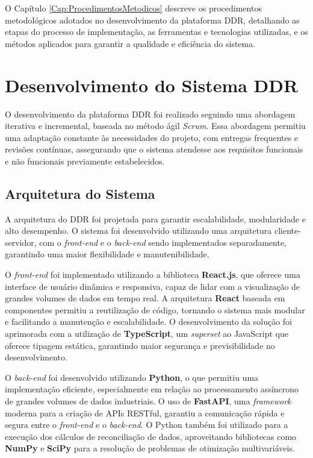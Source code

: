 \label{Cap:ProcedimentosMetodicos}

O Capítulo \ref{Cap:ProcedimentosMetodicos} descreve os procedimentos metodológicos adotados no desenvolvimento da plataforma DDR, detalhando as etapas do processo de implementação, as ferramentas e tecnologias utilizadas, e os métodos aplicados para garantir a qualidade e eficiência do sistema.

\section{Desenvolvimento do Sistema DDR}

O desenvolvimento da plataforma DDR foi realizado seguindo uma abordagem iterativa e incremental, baseada no método ágil \textit{Scrum}. Essa abordagem permitiu uma adaptação constante às necessidades do projeto, com entregas frequentes e revisões contínuas, assegurando que o sistema atendesse aos requisitos funcionais e não funcionais previamente estabelecidos.

\subsection{Arquitetura do Sistema}

A arquitetura do DDR foi projetada para garantir escalabilidade, modularidade e alto desempenho. O sistema foi desenvolvido utilizando uma arquitetura cliente-servidor, com o \textit{front-end} e o \textit{back-end} sendo implementados separadamente, garantindo uma maior flexibilidade e manutenibilidade.

O \textit{front-end} foi implementado utilizando a biblioteca \textbf{React.js}, que oferece uma interface de usuário dinâmica e responsiva, capaz de lidar com a visualização de grandes volumes de dados em tempo real. A arquitetura \textbf{React} baseada em componentes permitiu a reutilização de código, tornando o sistema mais modular e facilitando a manutenção e escalabilidade. O desenvolvimento da solução foi aprimorada com a utilização de \textbf{TypeScript}, um \textit{superset} ao JavaScript que oferece tipagem estática, garantindo maior segurança e previsibilidade no desenvolvimento.

O \textit{back-end} foi desenvolvido utilizando \textbf{Python}, o que permitiu uma implementação eficiente, especialmente em relação ao processamento assíncrono de grandes volumes de dados industriais. O uso de \textbf{FastAPI}, uma \textit{framework} moderna para a criação de APIs RESTful, garantiu a comunicação rápida e segura entre o \textit{front-end} e o \textit{back-end}. O Python também foi utilizado para a execução dos cálculos de reconciliação de dados, aproveitando bibliotecas como \textbf{NumPy} e \textbf{SciPy} para a resolução de problemas de otimização multivariáveis.

